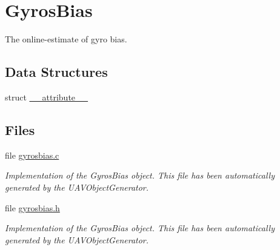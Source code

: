 \hypertarget{group___gyros_bias}{\section{\-Gyros\-Bias}
\label{group___gyros_bias}
}


\-The online-\/estimate of gyro bias.  


\subsection*{\-Data \-Structures}
\begin{DoxyCompactItemize}
\item 
struct \hyperlink{struct____attribute____}{\-\_\-\-\_\-attribute\-\_\-\-\_\-}
\end{DoxyCompactItemize}
\subsection*{\-Files}
\begin{DoxyCompactItemize}
\item 
file \hyperlink{gyrosbias_8c}{gyrosbias.\-c}
\begin{DoxyCompactList}\small\item\em \-Implementation of the \-Gyros\-Bias object. \-This file has been automatically generated by the \-U\-A\-V\-Object\-Generator. \end{DoxyCompactList}\item 
file \hyperlink{gyrosbias_8h}{gyrosbias.\-h}
\begin{DoxyCompactList}\small\item\em \-Implementation of the \-Gyros\-Bias object. \-This file has been automatically generated by the \-U\-A\-V\-Object\-Generator. \end{DoxyCompactList}\end{DoxyCompactItemize}
